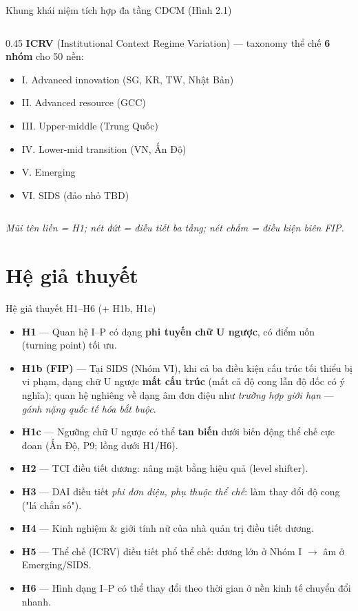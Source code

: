 \documentclass[aspectratio=169,11pt]{beamer}
\newcommand{\hl}[1]{\textcolor{accent2}{\textbf{#1}}}
\newcommand{\kw}[1]{\textcolor{accent}{\textbf{#1}}}
\begin{document}
\begin{frame}{Khung khái niệm tích hợp đa tầng CDCM (Hình 2.1)}
\begin{columns}[T]
\begin{column}{0.45\textwidth}
      \kw{ICRV} (Institutional Context Regime Variation) --- taxonomy thể chế \hl{6 nhóm} cho 50 nền:
      \begin{itemize}\scriptsize
        \item I. Advanced innovation (SG, KR, TW, Nhật Bản)
        \item II. Advanced resource (GCC)
        \item III. Upper-middle (Trung Quốc)
        \item IV. Lower-mid transition (VN, Ấn Độ)
        \item V. Emerging
        \item VI. SIDS (đảo nhỏ TBD)
      \end{itemize}
    \end{column}
  \end{columns}
  \vspace{0.2em}
  {\scriptsize\textit{Mũi tên liền = H1; nét đứt = điều tiết ba tầng; nét chấm = điều kiện biên FIP.}}
\end{frame}

\section{Hệ giả thuyết}
\begin{frame}{Hệ giả thuyết H1--H6 (+ H1b, H1c)}
  \begin{itemize}\small
    \item \kw{H1} --- Quan hệ I--P có dạng \hl{phi tuyến chữ U ngược}, có điểm uốn (turning point) tối ưu.
    \item \kw{H1b (FIP)} --- Tại SIDS (Nhóm VI), khi cả ba điều kiện cấu trúc tối thiểu bị vi phạm, dạng chữ U ngược \hl{mất cấu trúc} (mất cả độ cong lẫn độ dốc có ý nghĩa); quan hệ nghiêng về dạng âm đơn điệu như \emph{trường hợp giới hạn} --- \emph{gánh nặng quốc tế hóa bắt buộc}.
    \item \kw{H1c} --- Ngưỡng chữ U ngược có thể \hl{tan biến} dưới biến động thể chế cực đoan (Ấn Độ, P9; lồng dưới H1/H6).
    \item \kw{H2} --- TCI điều tiết dương: nâng mặt bằng hiệu quả (level shifter).
    \item \kw{H3} --- DAI điều tiết \emph{phi đơn điệu, phụ thuộc thể chế}: làm thay đổi độ cong ("lá chắn số").
    \item \kw{H4} --- Kinh nghiệm \& giới tính nữ của nhà quản trị điều tiết dương.
    \item \kw{H5} --- Thể chế (ICRV) điều tiết phổ thể chế: dương lớn ở Nhóm I $\to$ âm ở Emerging/SIDS.
    \item \kw{H6} --- Hình dạng I--P có thể thay đổi theo thời gian ở nền kinh tế chuyển đổi nhanh.
  \end{itemize}
\end{frame}
\end{document}
